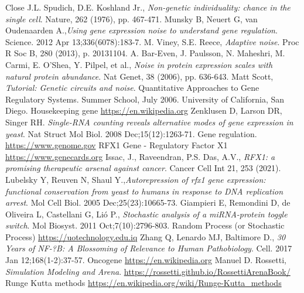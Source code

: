 \documentclass[12pt,a4paper]{report}
\begin{document}
\begin{thebibliography}{bibliography}
     Close J.L. Spudich, D.E. Koshland Jr., {\em Non-genetic individuality: chance in the single cell}. Nature, 262 (1976), pp. 467-471.
     Munsky B, Neuert G, van Oudenaarden A.,{\em Using gene expression noise to understand gene regulation}. Science. 2012 Apr 13;336(6078):183-7. 
     M. Viney, S.E. Reece, {\em Adaptive noise}. Proc R Soc B, 280 (2013), p. 20131104.
     A. Bar-Even, J. Paulsson, N. Maheshri, M. Carmi, E. O'Shea, Y. Pilpel, et al., {\em Noise in protein expression scales with natural protein abundance}. Nat Genet, 38 (2006), pp. 636-643.
     Matt Scott, {\em Tutorial: Genetic circuits and noise}. Quantitative Approaches to Gene Regulatory Systems. Summer School, July 2006. University of California, San Diego.
     Housekeeping gene \href{https://en.wikipedia.org/wiki/Housekeeping_gene}{https://en.wikipedia.org}
     Zenklusen D, Larson DR, Singer RH. {\em Single-RNA counting reveals alternative modes of gene expression in yeast}. Nat Struct Mol Biol. 2008 Dec;15(12):1263-71. 
     Gene regulation. \href{https://www.genome.gov/genetics-glossary/Gene-Regulation}{https://www.genome.gov}
     RFX1 Gene - Regulatory Factor X1 \href{https://www.genecards.org/cgi-bin/carddisp.pl?gene=RFX1}{https://www.genecards.org}
    Issac, J., Raveendran, P.S. Das, A.V., {\em RFX1: a promising therapeutic arsenal against cancer}. Cancer Cell Int 21, 253 (2021). 
    Lubelsky Y, Reuven N, Shaul Y.,{\em Autorepression of rfx1 gene expression: functional conservation from yeast to humans in response to DNA replication arrest}. Mol Cell Biol. 2005 Dec;25(23):10665-73.
     Giampieri E, Remondini D, de Oliveira L, Castellani G, Li\'o P., {\em Stochastic analysis of a miRNA-protein toggle switch}. Mol Biosyst. 2011 Oct;7(10):2796-803.
     Random Process (or Stochastic Process) \href{https://uotechnology.edu.iq/dep/coe/lectures/dr-THAMER/Probability%20&%20Statistics/ch%203.pdf}{https://uotechnology.edu.iq}
     Zhang Q, Lenardo MJ, Baltimore D., {\em 30 Years of NF-?B: A Blossoming of Relevance to Human Pathobiology}. Cell. 2017 Jan 12;168(1-2):37-57.
     Oncogene \href{https://en.wikipedia.org/wiki/Oncogene}{https://en.wikipedia.org}
     Manuel D. Rossetti, {\em Simulation Modeling and Arena}. \url{https://rossetti.github.io/RossettiArenaBook/}
     Runge Kutta methods \url{https://en.wikipedia.org/wiki/Runge-Kutta_methods}

\end{thebibliography}
\end{document}
